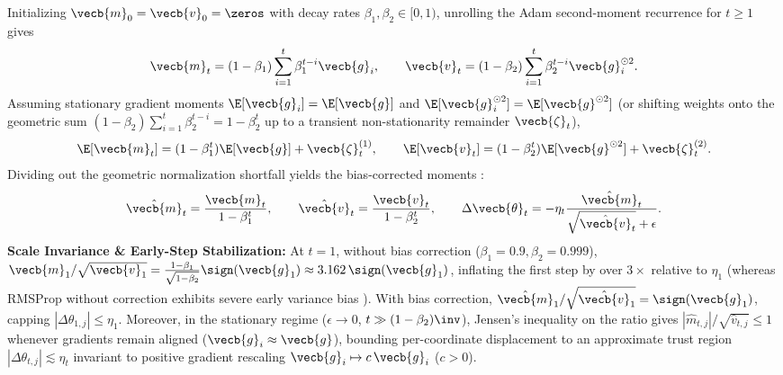 \documentclass[../../../../master.tex]{subfiles}
\begin{document}
\begin{coremath}
\label{thm:optalg:adam_bias}
Initializing $\vecb{m}_0 = \vecb{v}_0 = \zeros$ with decay rates $\beta_1, \beta_2 \in [0, 1)$, unrolling the Adam second-moment recurrence for $t \ge 1$ gives
\begin{equation}
\label{eq:optalg:adam_unroll}
  \vecb{m}_t = (1 - \beta_1)\sum_{i=1}^t \beta_1^{t-i}\vecb{g}_i, \qquad
  \vecb{v}_t = (1 - \beta_2)\sum_{i=1}^t \beta_2^{t-i}\vecb{g}_i^{\odot 2}.
\end{equation}
Assuming stationary gradient moments $\E[\vecb{g}_i] = \E[\vecb{g}]$ and $\E[\vecb{g}_i^{\odot 2}] = \E[\vecb{g}^{\odot 2}]$ (or shifting weights onto the geometric sum $(1 - \beta_2)\sum_{i=1}^t \beta_2^{t-i} = 1 - \beta_2^t$ up to a transient non-stationarity remainder $\vecb{\zeta}_t$),
\[
  \E[\vecb{m}_t] = (1 - \beta_1^t)\E[\vecb{g}] + \vecb{\zeta}_t^{(1)}, \qquad
  \E[\vecb{v}_t] = (1 - \beta_2^t)\E[\vecb{g}^{\odot 2}] + \vecb{\zeta}_t^{(2)}.
\]
Dividing out the geometric normalization shortfall yields the bias-corrected moments  :
\begin{equation}
\label{eq:optalg:adam_bc}
  \hat{\vecb{m}}_t = \frac{\vecb{m}_t}{1 - \beta_1^t}, \qquad
  \hat{\vecb{v}}_t = \frac{\vecb{v}_t}{1 - \beta_2^t}, \qquad
  \Delta\vecb{\theta}_t = -\eta_t \frac{\hat{\vecb{m}}_t}{\sqrt{\hat{\vecb{v}}_t} + \epsilon}.
\end{equation}
\textbf{Scale Invariance \& Early-Step Stabilization:} At $t=1$, without bias correction ($\beta_1=0.9, \beta_2=0.999$), $\vecb{m}_1/\sqrt{\vecb{v}_1} = \frac{1-\beta_1}{\sqrt{1-\beta_2}}\sign(\vecb{g}_1) \approx 3.162\,\sign(\vecb{g}_1)$, inflating the first step by over $3\times$ relative to $\eta_1$ (whereas RMSProp without correction exhibits severe early variance bias ). With bias correction, $\hat{\vecb{m}}_1/\sqrt{\hat{\vecb{v}}_1} = \sign(\vecb{g}_1)$, capping $|\Delta\theta_{1,j}| \le \eta_1$. Moreover, in the stationary regime ($\epsilon \to 0$, $t \gg (1-\beta_2)\inv$), Jensen's inequality on the ratio gives $|\hat{m}_{t,j}|/\sqrt{\hat{v}_{t,j}} \le 1$ whenever gradients remain aligned ($\vecb{g}_i \approx \vecb{g}$), bounding per-coordinate displacement to an approximate trust region $|\Delta\theta_{t,j}| \lesssim \eta_t$ invariant to positive gradient rescaling $\vecb{g}_i \mapsto c\,\vecb{g}_i$ ($c > 0$).
\end{coremath}
\end{document}
